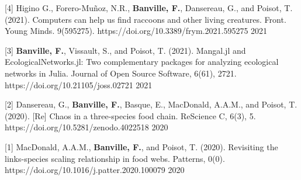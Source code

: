\begin{cventries}
  \cventry
    {[4] Higino G., Forero-Muñoz, N.R., \textbf{Banville, F.}, Dansereau, G., and Poisot, T. (2021). Computers can help us find raccoons and other living creatures. Front. Young Minds. 9(595275). https://doi.org/10.3389/frym.2021.595275} %
    {} {} {2021} 
    {
      \begin{cvitems} %
      \end{cvitems}
    }

  \cventry
    {[3] \textbf{Banville, F.}, Vissault, S., and Poisot, T. (2021). Mangal.jl and EcologicalNetworks.jl: Two complementary packages for analyzing ecological networks in Julia. Journal of Open Source Software, 6(61), 2721. https://doi.org/10.21105/joss.02721} %
    {} {} {2021} 
    {
      \begin{cvitems} %
      \end{cvitems}
    }

  \cventry
    {[2] Dansereau, G., \textbf{Banville, F.}, Basque, E., MacDonald, A.A.M., and Poisot, T. (2020). [Re] Chaos in a three-species food chain. ReScience C, 6(3), 5. https://doi.org/10.5281/zenodo.4022518} %
    {} {} {2020} 
    {
      \begin{cvitems} %
      \end{cvitems}
    }

  \cventry
    {[1] MacDonald, A.A.M., \textbf{Banville, F.}, and Poisot, T. (2020). Revisiting the links-species scaling relationship in food webs. Patterns, 0(0). https://doi.org/10.1016/j.patter.2020.100079} %
    {} {} {2020} 
    {
      \begin{cvitems} %
      \end{cvitems}
    }

\end{cventries}


